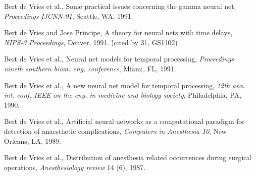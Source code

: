 \begin{etaremune}
\item Bert de Vries et al., Some practical issues concerning the gamma
neural net, {\em Proceedings IJCNN-91},
Seattle, WA, 1991.

\item Bert de Vries and Jose Principe, A theory for neural nets with time
delays, {\em NIPS-3 Proceedings},
Denver, 1991. \r{(cited by 31, GS1102)}

\item Bert de Vries et al., Neural net models for temporal processing, {\em Proceedings nineth southern biom. eng. conference}, Miami, FL, 1991.

\item Bert de Vries et al., A new neural net model for temporal processing,
{\em 12th ann. int. conf. IEEE on
the eng. in medicine and biology society}, Philadelphia, PA, 1990.

\item Bert de Vries et al., Artificial neural networks as a computational paradigm for detection of anaesthetic complications,
{\em Computers in Anesthesia 10}, New Orleans, LA, 1989.

\item Bert de Vries et al., Distribution of anesthesia related occurrences during surgical operations,
{\em Anesthesiology review} 14 (6), 1987.

\end{etaremune}

